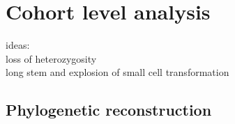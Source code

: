 

\section{Cohort level analysis}
\label{cascade-sec:cohortLevel}

ideas:\\
loss of heterozygosity \\
long stem and explosion of small cell transformation\\


\subsection{Phylogenetic reconstruction}
\label{cascade-sec:phylocohort}

